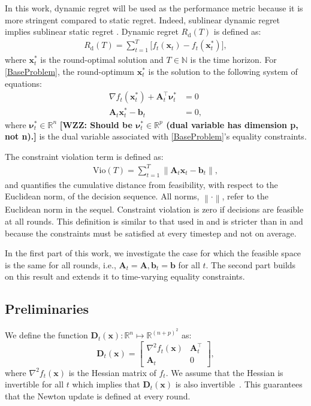 \documentclass[journal,twoside,web]{ieeecolor}
\newcommand{\norm}[1]{\left\lVert#1\right\rVert}
\newcommand{\xx}{\mathbf{x}}
\newcommand{\bb}{\mathbf{b}}
\renewcommand{\AA}{\mathbf{A}}
\newcommand{\vv}{\bm{\nu}}
\newcommand{\DD}{\mathbf{D}}
\newcommand{\WZZtypo}[1]{{\color{blue}\bf{[WZZ: #1]}}}
\begin{document}
In this work, dynamic regret will be used as the performance metric because it is more stringent compared to static regret. Indeed, sublinear dynamic regret implies sublinear static regret \cite{FTRLTime-Varying}. Dynamic regret $R_{\text{d}}(T)$ is defined as:
\begin{align}\label{RegretDef}R_{\text{d}}(T) = \sum\limits_{t=1}^{T} \big[f_t(\xx_t)-f_t(\xx^*_t)\big],\end{align}
where $\xx_t^*$ is the round-optimal solution and $T\in\mathbb{N}$ is the time horizon. For \eqref{BaseProblem}, the round-optimum $\xx_t^*$ is the solution to the following system of equations:
\begin{align*}
    \nabla f_t(\xx^*_t) + \AA_t^\top\vv^*_t&=0\\
    \AA_t\xx^*_t-\bb_t &= 0,
\end{align*}
where $\vv_t^*\in \mathbb{R}^n$ \WZZtypo{Should be $\vv_t^*\in \mathbb{R}^p$ (dual variable has dimension p, not n).} is the dual variable associated with \eqref{BaseProblem}'s equality constraints.

The constraint violation term is defined as:
\begin{align}\label{VioDef}\text{Vio}(T) = \sum\limits_{t=1}^T \norm{\AA_t\xx_t-\bb_t},\end{align}
and quantifies the cumulative distance from feasibility, with respect to the Euclidean norm, of the decision sequence. All norms, $\norm{\cdot}$, refer to the Euclidean norm in the sequel. Constraint violation is zero if decisions are feasible at all rounds. {This definition is similar to that used in \cite{MOSP, DynamicPolyak} and is stricter than in \cite{LagrangianTime-Varying} and \cite{QueueConstrained} because the constraints must be satisfied at every timestep and not on average.}  


In the first part of this work, we investigate the case for which the feasible space is the same for all rounds, i.e., $\AA_t=\AA, \bb_t=\bb$ for all $t$. The second part builds on this result and extends it to time-varying equality constraints.



\subsection{Preliminaries}

We define the function $\DD_t(\xx):\mathbb{R}^n\mapsto\mathbb{R}^{(n+p)^2}$ as:
\begin{equation*}\DD_t(\xx) = \begin{bmatrix}\nabla^2f_t(\xx) & \mathbf{A}^\top_t\\\mathbf{A}_t&0\end{bmatrix},\end{equation*}
where $\nabla^2f_t(\xx)$ is the Hessian matrix of $f_t$. We assume that the Hessian is invertible for all $t$ which implies that $\DD_t(\xx)$ is also invertible~\cite[Section 10.1]{boyd}. This guarantees that the Newton update is defined at every round.
\end{document}
